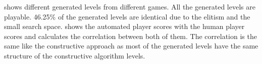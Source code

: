 

 shows different generated levels from different games.  All the generated levels are playable. 46.25\% of the generated levels are identical due to the elitism and the small search space.  shows the automated player scores with the human player scores and calculates the correlation between both of them. The correlation is the same like the constructive approach as most of the generated levels have the same structure of the constructive algorithm levels.


